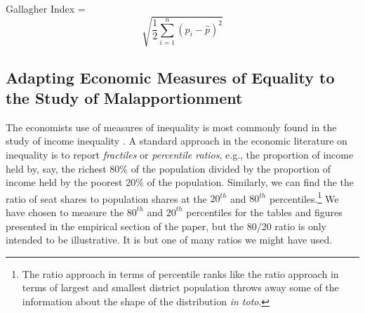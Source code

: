  
  Gallagher Index =
  \begin{equation}\label{eq:gall}
  \sqrt{\frac{1}{2} \sum_{i=1}^{n}{(p_i - \hat{p})^2}}
  \end{equation}
%

%
    \subsection*{Adapting Economic Measures of Equality to the Study of Malapportionment} \label{sec:economic}

The economists use of measures of inequality is most commonly found in the study of income inequality \citep{Yntema1933, Atkinson1970, Foster1985, BaiLagunoff2013}. A standard approach in the economic literature on inequality is to report \textit{fractiles} or \textit{percentile ratios}, e.g., the proportion of income held by, say, the richest 80\% of the population divided by the proportion of income held by the poorest 20\% of the population. Similarly, we can find the the ratio of seat shares to population shares at the $20^{th}$ and $80^{th}$ percentiles.\footnote{The ratio approach in terms of percentile ranks like the ratio approach in terms of largest and smallest district population throws away some of the information about the shape of the distribution \textit{in toto}.} We have chosen to measure the $80^{th}$ and $20^{th}$ percentiles for the tables and figures presented in the empirical section of the paper, but the 80/20 ratio is only intended to be illustrative. It is but one of many ratios we might have used.

